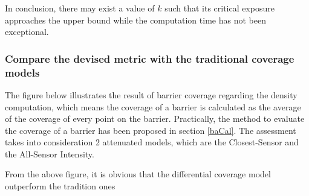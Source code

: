 In conclusion, there may exist a value of $k$ such that its critical exposure approaches the upper bound while the computation time has not been exceptional.

\subsubsection{Compare the devised metric with the traditional coverage models}
The figure below illustrates the result of barrier coverage regarding the density computation, which means the coverage of a barrier is calculated as the average of the coverage of every point on the barrier. Practically, the method to evaluate the coverage of a barrier has been proposed in section \ref{baCal}. The assessment takes into consideration 2 attenuated models, which are the Closest-Sensor and the All-Sensor Intensity.

From the above figure, it is obvious that the differential coverage model outperform the tradition ones